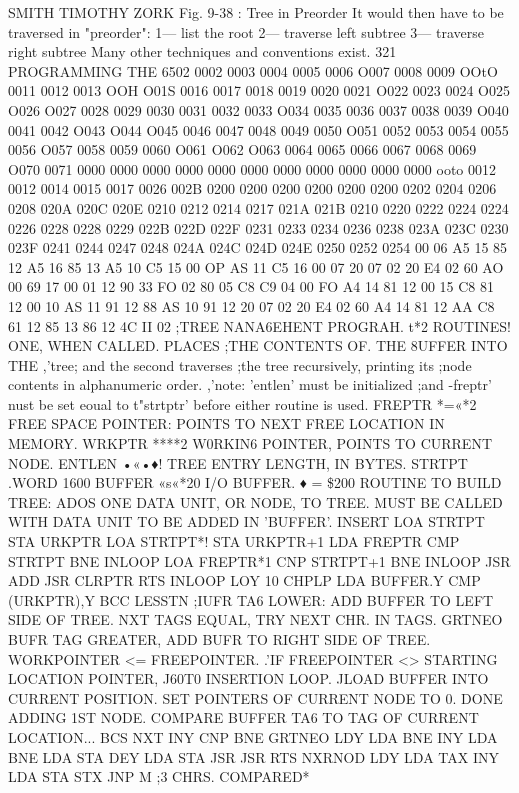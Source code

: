 \documentclass{book}
\begin{document}
{{{{{{{{{{{{{{{{{{{{{{{{{{{{{SMITH TIMOTHY
ZORK
Fig. 9-38 : Tree in Preorder
It would then have to be traversed in "preorder":
1— list the root
2— traverse left subtree
3— traverse right subtree
Many other techniques and conventions exist.
321
PROGRAMMING THE 6502
0002
0003
0004
0005
0006
O007
0008
0009
OOtO
0011
0012
0013
OOH
O01S
0016
0017
0018
0019
0020
0021
O022
0023
0024
O025
O026
O027
0028
0029
0030
0031
0032
0033
O034
0035
0036
0037
0038
0039
O040
0041
0042
O043
O044
O045
0046
0047
0048
0049
0050
O051
0052
0053
0054
0055
0056
O057
0058
0059
0060
O061
O062
O063
0064
0065
0066
0067
0068
0069
O070
0071
0000
0000
0000
0000
0000
0000
0000
0000
0000
0000
0000
ooto
0012
0012
0014
0015
0017
0026
002B
0200
0200
0200
0200
0200
0200
0202
0204
0206
0208
020A
020C
020E
0210
0212
0214
0217
021A
021B
0210
0220
0222
0224
0224
0226
0228
0228
0229
022B
022D
022F
0231
0233
0234
0236
0238
023A
023C
0230
023F
0241
0244
0247
0248
024A
024C
024D
024E
0250
0252
0254
00 06
A5 15
85 12
A5 16
85 13
A5 10
C5 15
00 OP
AS 11
C5 16
00 07
20 07 02
20 E4 02
60
AO 00
69 17 00
01 12
90 33
FO 02
80 05
C8
C9 04
00 FO
A4 14
81 12
00 15
C8
81 12
00 10
AS 11
91 12
88
AS 10
91 12
20 07 02
20 E4 02
60
A4 14
81 12
AA
C8
61 12
85 13
86 12
4C II 02
;TREE NANA6EHENT PROGRAH.
t*2 ROUTINES! ONE, WHEN CALLED. PLACES
;THE CONTENTS OF. THE 8UFFER INTO THE
,'tree; and the second traverses
;the tree recursively, printing its
;node contents in alphanumeric order.
,'note: 'entlen' must be initialized
;and -freptr' nust be set eoual to
t"strtptr' before either routine is used.
FREPTR *=«*2 {FREE SPACE POINTER: POINTS TO
{NEXT FREE LOCATION IN MEMORY.
WRKPTR ****2 {W0RKIN6 POINTER, POINTS TO CURRENT NODE.
ENTLEN •«•♦! {TREE ENTRY LENGTH, IN BYTES.
STRTPT .WORD 1600
BUFFER «s«*20 {I/O BUFFER.
♦ = \$200
{ROUTINE TO BUILD TREE: ADOS ONE DATA UNIT,
{OR NODE, TO TREE. MUST BE CALLED
{WITH DATA UNIT TO BE ADDED IN 'BUFFER'.
INSERT LOA STRTPT
STA URKPTR
LOA STRTPT*!
STA URKPTR+1
LDA FREPTR
CMP STRTPT
BNE INLOOP
LOA FREPTR*1
CNP STRTPT+1
BNE INLOOP
JSR ADD
JSR CLRPTR
RTS
INLOOP LOY 10
CHPLP LDA BUFFER.Y
CMP (URKPTR),Y
BCC LESSTN ;IUFR TA6 LOWER: ADD BUFFER TO
{LEFT SIDE OF TREE.
NXT {TAGS EQUAL, TRY NEXT CHR. IN TAGS.
GRTNEO {BUFR TAG GREATER, ADD BUFR TO
{RIGHT SIDE OF TREE.
{WORKPOINTER <= FREEPOINTER.
.'IF FREEPOINTER <>
{STARTING LOCATION POINTER,
J60T0 INSERTION LOOP.
JLOAD BUFFER INTO CURRENT POSITION.
{SET POINTERS OF CURRENT NODE TO 0.
{DONE ADDING 1ST NODE.
{COMPARE BUFFER TA6 TO TAG OF CURRENT
{LOCATION...
BCS
NXT INY
CNP
BNE
GRTNEO LDY
LDA
BNE
INY
LDA
BNE
LDA
STA
DEY
LDA
STA
JSR
JSR
RTS
NXRNOD LDY
LDA
TAX
INY
LDA
STA
STX
JNP
M ;3 CHRS. COMPARED*
}}}}}}}}}}}}}}}}}}}}}}}}}}}}}}}}}}}}}}}}}}}}}}}
\end{document}
